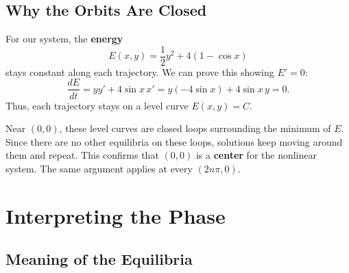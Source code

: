 \documentclass[11pt,letterpaper]{article}
\begin{document}
\begin{center}
\end{center}


\subsection{Why the Orbits Are Closed}

For our system, the \textbf{energy}
\[
E(x,y)=\frac12y^2+4(1-\cos x)
\]
stays constant along each trajectory. We can prove this showing $E'=0$:
\[
\frac{dE}{dt}
=yy'+4\sin x\,x'
=y(-4\sin x)+4\sin x\,y=0.
\]
Thus, each trajectory stays on a level curve $E(x,y)=C$.

Near $(0,0)$, these level curves are closed loops
surrounding the minimum of $E$. Since there are no
other equilibria on these loops, solutions keep
moving around them and repeat. This confirms that
$(0,0)$ is a \textbf{center} for the nonlinear system.
The same argument applies at every $(2n\pi,0)$.

\section{Interpreting the Phase}

\subsection{Meaning of the Equilibria}
\end{document}
